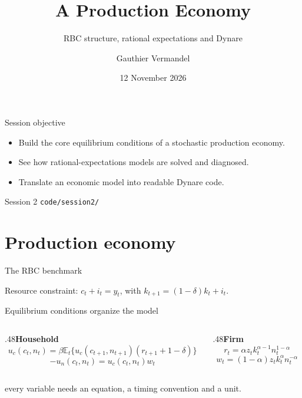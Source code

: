 \documentclass[aspectratio=169,10pt]{beamer}
\title[BTM -- Session 2]{A Production Economy}
\subtitle{RBC structure, rational expectations and Dynare}
\author[Gauthier Vermandel]{Gauthier Vermandel}
\institute{Paris-Dauphine -- PSL}
\date{12 November 2026}
\begin{document}
\begin{frame}\titlepage\end{frame}
\begin{frame}{Session objective}\begin{itemize}\item Build the core equilibrium conditions of a stochastic production economy.\item See how rational-expectations models are solved and diagnosed.\item Translate an economic model into readable Dynare code.\end{itemize}\vfill{} Session 2 \quad {} \texttt{code/session2/}\end{frame}
\section{Production economy}
\begin{frame}{The RBC benchmark}
\centering{}
\vfill Resource constraint: \(c_t+i_t=y_t\), with \(k_{t+1}=(1-\delta)k_t+i_t\).\end{frame}
\begin{frame}{Equilibrium conditions organize the model}
\begin{columns}[T]\begin{column}{.48\textwidth}\textbf{Household}
\[u_c(c_t,n_t)=\beta\mathbb E_t\{u_c(c_{t+1},n_{t+1})(r_{t+1}+1-\delta)\}\]
\[-u_n(c_t,n_t)=u_c(c_t,n_t)w_t\]
\end{column}\begin{column}{.48\textwidth}\textbf{Firm}
\[r_t=\alpha z_t k_t^{\alpha-1}n_t^{1-\alpha}\]
\[w_t=(1-\alpha)z_t k_t^\alpha n_t^{-\alpha}\]
\end{column}\end{columns}\vfill{} every variable needs an equation, a timing convention and a unit.\end{frame}
\end{document}
